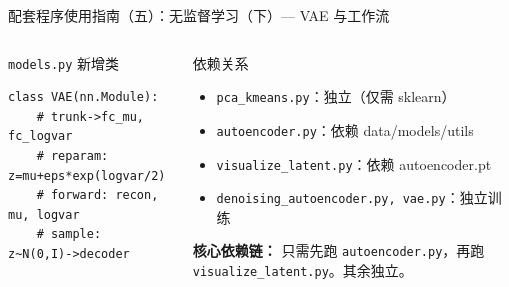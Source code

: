 \documentclass[aspectratio=169]{ctexbeamer}
\begin{document}
\begin{frame}[fragile,shrink=20]{配套程序使用指南（五）：无监督学习（下）— VAE 与工作流}
\begin{columns}[T]
\begin{block}{\texttt{models.py} 新增类}
\begin{lstlisting}[basicstyle=\ttfamily\scriptsize, frame=none, numbers=none, backgroundcolor=\color{codebg}]
class VAE(nn.Module):
    # trunk->fc_mu, fc_logvar
    # reparam: z=mu+eps*exp(logvar/2)
    # forward: recon, mu, logvar
    # sample: z~N(0,I)->decoder
\end{lstlisting}
\end{block}

\vspace{0.05cm}

\begin{block}{依赖关系}
\footnotesize
\begin{itemize}
  \item \texttt{pca\_kmeans.py}：独立（仅需 sklearn）
  \item \texttt{autoencoder.py}：依赖 data/models/utils
  \item \texttt{visualize\_latent.py}：依赖 autoencoder.pt
  \item \texttt{denoising\_autoencoder.py, vae.py}：独立训练
\end{itemize}
\textbf{核心依赖链：} 只需先跑 \texttt{autoencoder.py}，再跑 \texttt{visualize\_latent.py}。其余独立。
\end{block}
\end{columns}
\end{frame}
\end{document}
